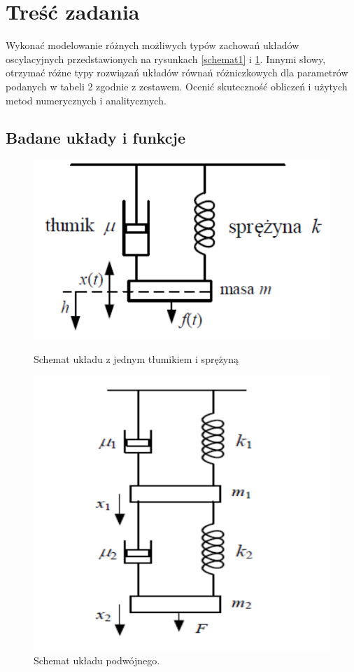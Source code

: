 \documentclass[12pt]{article}
\begin{document}
\section{Treść zadania}
Wykonać modelowanie różnych możliwych typów zachowań
układów oscylacyjnych przedstawionych na rysunkach \ref{schemat1} i \ref{schemat2}. Innymi słowy,
otrzymać różne typy rozwiązań układów równań różniczkowych dla
parametrów podanych w tabeli 2 zgodnie z zestawem. Ocenić skuteczność
obliczeń i użytych metod numerycznych i analitycznych.

\subsection{Badane układy i funkcje}
\begin{figure}[H]
  \centering
  \begin{minipage}[b]{0.4\textwidth}
    \includegraphics[width=\textwidth]{./img/schemat-1.png}
    \caption{Schemat układu z jednym tłumikiem i sprężyną}
    \label{schemat1}
  \end{minipage}
  \hfill
  \begin{minipage}[b]{0.4\textwidth}
    \includegraphics[width=\textwidth]{./img/schemat-2.png}
    \caption{Schemat układu podwójnego.}
    \label{schemat2}
  \end{minipage}
\end{figure}
\end{document}
